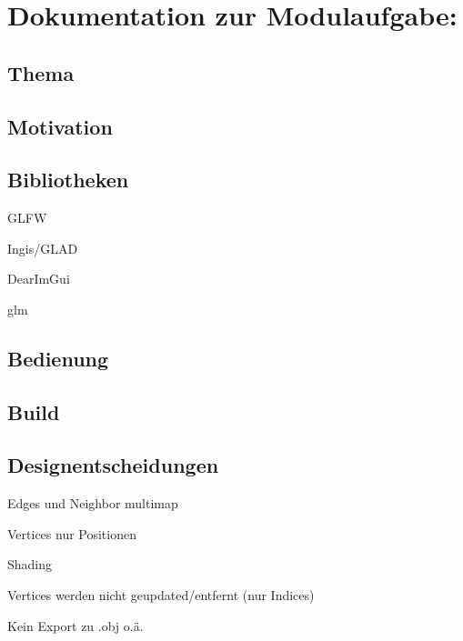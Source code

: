 \documentclass[a4paper,12pt]{book}
\begin{document}
\chapter*{Dokumentation zur Modulaufgabe:}

\section*{Thema}

\section*{Motivation}

\section*{Bibliotheken}

GLFW

Ingis/GLAD

DearImGui

glm

\section*{Bedienung}

\section*{Build}

\section*{Designentscheidungen}

Edges und Neighbor multimap 

Vertices nur Positionen

Shading

Vertices werden nicht geupdated/entfernt (nur Indices)

Kein Export zu .obj o.ä.
\end{document}

